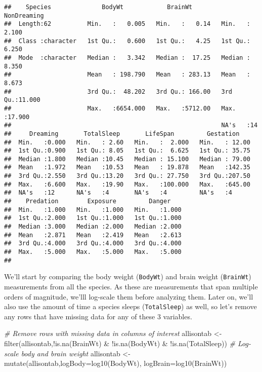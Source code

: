 \documentclass[
]{book}
\newenvironment{Shaded}{\begin{snugshade}}{\end{snugshade}}
\newcommand{\AttributeTok}[1]{\textcolor[rgb]{0.77,0.63,0.00}{#1}}
\newcommand{\CommentTok}[1]{\textcolor[rgb]{0.56,0.35,0.01}{\textit{#1}}}
\newcommand{\FunctionTok}[1]{\textcolor[rgb]{0.00,0.00,0.00}{#1}}
\newcommand{\NormalTok}[1]{#1}
\newcommand{\OtherTok}[1]{\textcolor[rgb]{0.56,0.35,0.01}{#1}}
\newcommand{\SpecialCharTok}[1]{\textcolor[rgb]{0.00,0.00,0.00}{#1}}
\begin{document}
\begin{verbatim}
##    Species              BodyWt            BrainWt         NonDreaming    
##  Length:62          Min.   :   0.005   Min.   :   0.14   Min.   : 2.100  
##  Class :character   1st Qu.:   0.600   1st Qu.:   4.25   1st Qu.: 6.250  
##  Mode  :character   Median :   3.342   Median :  17.25   Median : 8.350  
##                     Mean   : 198.790   Mean   : 283.13   Mean   : 8.673  
##                     3rd Qu.:  48.202   3rd Qu.: 166.00   3rd Qu.:11.000  
##                     Max.   :6654.000   Max.   :5712.00   Max.   :17.900  
##                                                          NA's   :14      
##     Dreaming       TotalSleep       LifeSpan         Gestation     
##  Min.   :0.000   Min.   : 2.60   Min.   :  2.000   Min.   : 12.00  
##  1st Qu.:0.900   1st Qu.: 8.05   1st Qu.:  6.625   1st Qu.: 35.75  
##  Median :1.800   Median :10.45   Median : 15.100   Median : 79.00  
##  Mean   :1.972   Mean   :10.53   Mean   : 19.878   Mean   :142.35  
##  3rd Qu.:2.550   3rd Qu.:13.20   3rd Qu.: 27.750   3rd Qu.:207.50  
##  Max.   :6.600   Max.   :19.90   Max.   :100.000   Max.   :645.00  
##  NA's   :12      NA's   :4       NA's   :4         NA's   :4       
##    Predation        Exposure         Danger     
##  Min.   :1.000   Min.   :1.000   Min.   :1.000  
##  1st Qu.:2.000   1st Qu.:1.000   1st Qu.:1.000  
##  Median :3.000   Median :2.000   Median :2.000  
##  Mean   :2.871   Mean   :2.419   Mean   :2.613  
##  3rd Qu.:4.000   3rd Qu.:4.000   3rd Qu.:4.000  
##  Max.   :5.000   Max.   :5.000   Max.   :5.000  
## 
\end{verbatim}

We'll start by comparing the body weight (\texttt{BodyWt}) and brain weight (\texttt{BrainWt}) measurements from all the species. As these are measurements that span multiple orders of magnitude, we'lll log-scale them before analyzing them. Later on, we'll also use the amount of time a species sleeps (\texttt{TotalSleep}) as well, so let's remove any rows that have missing data for any of these 3 variables.

\begin{Shaded}
\begin{Highlighting}[]
\CommentTok{\# Remove rows with missing data in columns of interest }
\NormalTok{allisontab }\OtherTok{\textless{}{-}} \FunctionTok{filter}\NormalTok{(allisontab,}\SpecialCharTok{!}\FunctionTok{is.na}\NormalTok{(BrainWt) }\SpecialCharTok{\&} \SpecialCharTok{!}\FunctionTok{is.na}\NormalTok{(BodyWt) }\SpecialCharTok{\&} \SpecialCharTok{!}\FunctionTok{is.na}\NormalTok{(TotalSleep))}
\CommentTok{\# Log{-}scale body and brain weight}
\NormalTok{allisontab }\OtherTok{\textless{}{-}} \FunctionTok{mutate}\NormalTok{(allisontab,}\AttributeTok{logBody=}\FunctionTok{log10}\NormalTok{(BodyWt), }\AttributeTok{logBrain=}\FunctionTok{log10}\NormalTok{(BrainWt))}
\end{Highlighting}
\end{Shaded}
\end{document}
